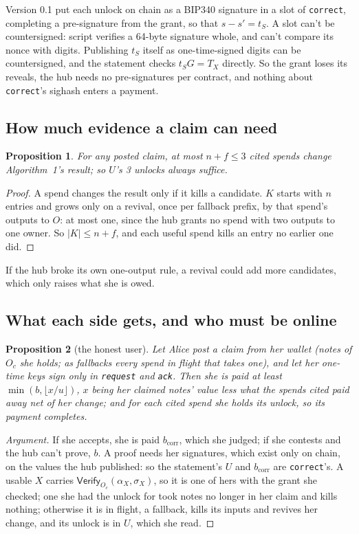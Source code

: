 \documentclass[11pt]{article}
\theoremstyle{plain}
\newtheorem{proposition}{Proposition}
\theoremstyle{definition}
\newcommand{\bcorr}{b_{\mathrm{corr}}}
\newcommand{\tx}[1]{\texttt{#1}}
\newcommand{\Vfy}{\mathsf{Verify}}
\newcommand{\Oc}{O_c}
\begin{document}
Version 0.1 put each unlock on chain as a BIP340 signature in a slot of
\tx{correct}, completing a pre-signature from the grant, so that $s - s'
= t_S$. A slot can't be countersigned: script verifies a 64-byte
signature whole, and can't compare its nonce with digits. Publishing
$t_S$ itself as one-time-signed digits can be countersigned, and the
statement checks $t_SG = T_X$ directly. So the grant loses its reveals,
the hub needs no pre-signatures per contract, and nothing about
\tx{correct}'s sighash enters a payment.

\subsection{How much evidence a claim can need}\label{sec:volume}

\begin{proposition}\label{prop:volume}
For any posted claim, at most $n + f \le 3$ cited spends change
Algorithm~1's result; so $U$'s 3 unlocks always suffice.
\end{proposition}
\begin{proof}
A spend changes the result only if it kills a candidate. $K$ starts with
$n$ entries and grows only on a revival, once per fallback prefix, by
that spend's outputs to $O$: at most one, since the hub grants no spend
with two outputs to one owner. So $|K| \le n + f$, and each useful
spend kills an entry no earlier one did.
\end{proof}

If the hub broke its own one-output rule, a revival could add more
candidates, which only raises what she is owed.

\subsection{What each side gets, and who must be online}\label{sec:who}

\begin{proposition}[the honest user]\label{prop:user}
Let Alice post a claim from her wallet (notes of $\Oc$ she holds; as
fallbacks every spend in flight that takes one), and let her one-time
keys sign only in \tx{request} and \tx{ack}. Then she is paid at least
$\min(b, \lfloor x/u \rfloor)$, $x$ being her claimed notes' value less
what the spends cited paid away net of her change; and for each cited
spend she holds its unlock, so its payment completes.
\end{proposition}
\begin{proof}[Argument]
If she accepts, she is paid $\bcorr$, which she judged; if she contests
and the hub can't prove, $b$. A proof needs her signatures, which exist
only on chain, on the values the hub published: so the statement's $U$
and $\bcorr$ are \tx{correct}'s. A usable $X$ carries $\Vfy_{\Oc}(\alpha_X,
\sigma_X)$, so it is one of hers with the grant she checked; one she had
the unlock for took notes no longer in her claim and kills nothing;
otherwise it is in flight, a fallback, kills its inputs and revives her
change, and its unlock is in $U$, which she read.
\end{proof}
\end{document}
